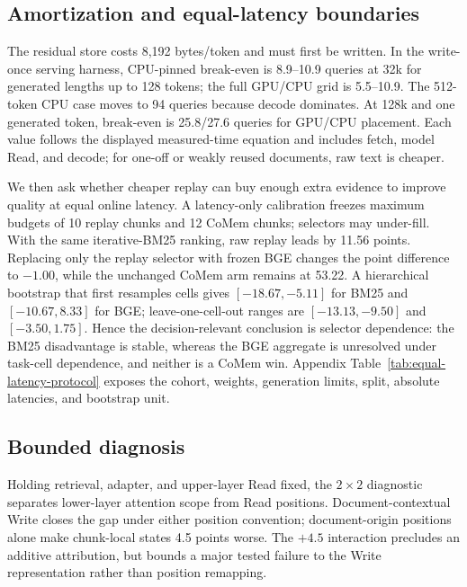 \subsection{Amortization and equal-latency boundaries}


The residual store costs 8,192 bytes/token and must first be written. In the
write-once serving harness, CPU-pinned break-even is 8.9--10.9 queries at 32k
for generated lengths up to 128 tokens; the full GPU/CPU grid is 5.5--10.9.
The 512-token CPU case moves to 94 queries because decode dominates. At 128k
and one generated token, break-even is 25.8/27.6 queries for GPU/CPU placement.
Each value follows the displayed measured-time equation and includes fetch,
model Read, and decode; for one-off or weakly reused documents, raw text is
cheaper.



We then ask whether cheaper replay can buy enough extra evidence to improve
quality at equal online latency. A latency-only calibration freezes maximum
budgets of 10 replay chunks and 12 CoMem chunks; selectors may under-fill.
With the same iterative-BM25 ranking, raw replay
leads by 11.56 points. Replacing only the replay selector with frozen BGE changes
the point difference to $-1.00$, while the unchanged CoMem arm remains at
53.22. A hierarchical bootstrap that first resamples cells gives
$[-18.67,-5.11]$ for BM25 and $[-10.67,8.33]$ for BGE; leave-one-cell-out
ranges are $[-13.13,-9.50]$ and $[-3.50,1.75]$. Hence the decision-relevant
conclusion is selector dependence: the BM25 disadvantage is stable, whereas the
BGE aggregate is unresolved under task-cell dependence, and neither is a CoMem
win.
Appendix Table~\ref{tab:equal-latency-protocol} exposes the cohort, weights,
generation limits, split, absolute latencies, and bootstrap unit.

\subsection{Bounded diagnosis}



Holding retrieval, adapter, and upper-layer Read fixed, the $2{\times}2$
diagnostic separates lower-layer attention scope from Read positions.
Document-contextual Write closes the gap under either position convention;
document-origin positions alone make chunk-local states 4.5 points worse. The
$+4.5$ interaction precludes an additive attribution, but bounds a major tested
failure to the Write representation rather than position remapping.

